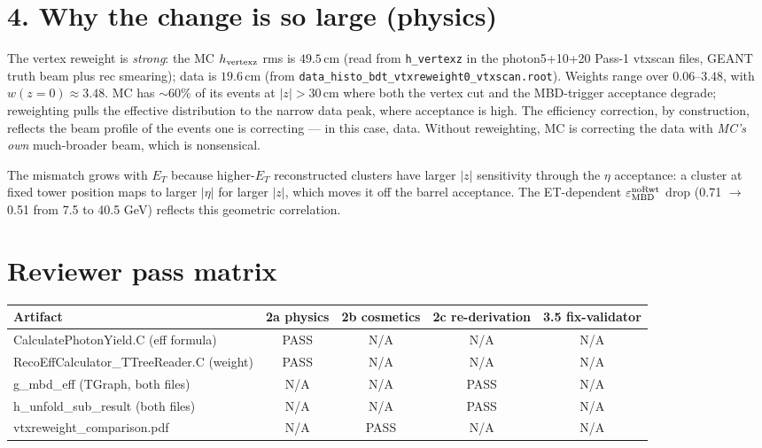 \documentclass[11pt,a4paper]{article}
\begin{document}
\section*{4. Why the change is so large (physics)}

The vertex reweight is \emph{strong}: the MC $h_{\rm vertexz}$ rms is $49.5$\,cm (read from \texttt{h\_vertexz} in the photon5+10+20 Pass-1 vtxscan files, GEANT truth beam plus rec smearing); data is $19.6$\,cm (from \texttt{data\_histo\_bdt\_vtxreweight0\_vtxscan.root}). Weights range over $0.06$--$3.48$, with $w(z=0) \approx 3.48$. MC has $\sim\!60\%$ of its events at $|z|>30$\,cm where both the vertex cut and the MBD-trigger acceptance degrade; reweighting pulls the effective distribution to the narrow data peak, where acceptance is high. The efficiency correction, by construction, reflects the beam profile of the events one is correcting --- in this case, data. Without reweighting, MC is correcting the data with \emph{MC's own} much-broader beam, which is nonsensical.

The mismatch grows with $E_T$ because higher-$E_T$ reconstructed clusters have larger $|z|$ sensitivity through the $\eta$ acceptance: a cluster at fixed tower position maps to larger $|\eta|$ for larger $|z|$, which moves it off the barrel acceptance. The ET-dependent $\varepsilon_{\rm MBD}^{\rm noRwt}$ drop (0.71 $\to$ 0.51 from 7.5 to 40.5 GeV) reflects this geometric correlation.

\section*{Reviewer pass matrix}

\begin{center}\small
\begin{tabular}{lcccc}
\toprule
Artifact & 2a physics & 2b cosmetics & 2c re-derivation & 3.5 fix-validator \\
\midrule
CalculatePhotonYield.C (eff formula)      & PASS & N/A & N/A  & N/A \\
RecoEffCalculator\_TTreeReader.C (weight) & PASS & N/A & N/A  & N/A \\
g\_mbd\_eff (TGraph, both files)          & N/A  & N/A & PASS & N/A \\
h\_unfold\_sub\_result (both files)       & N/A  & N/A & PASS & N/A \\
vtxreweight\_comparison.pdf               & N/A  & PASS& N/A  & N/A \\
\bottomrule
\end{tabular}
\end{center}
\end{document}
